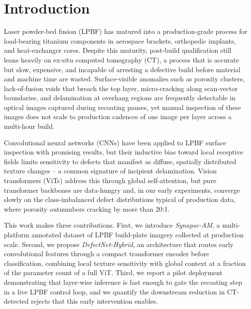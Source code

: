 \section{Introduction}
Laser powder-bed fusion (LPBF) has matured into a production-grade process for load-bearing titanium components in aerospace brackets, orthopedic implants, and heat-exchanger cores. Despite this maturity, post-build qualification still leans heavily on ex-situ computed tomography (CT), a process that is accurate but slow, expensive, and incapable of arresting a defective build before material and machine time are wasted. Surface-visible anomalies such as porosity clusters, lack-of-fusion voids that breach the top layer, micro-cracking along scan-vector boundaries, and delamination at overhang regions are frequently detectable in optical images captured during recoating pauses, yet manual inspection of these images does not scale to production cadences of one image per layer across a multi-hour build.

Convolutional neural networks (CNNs) have been applied to LPBF surface inspection with promising results, but their inductive bias toward local receptive fields limits sensitivity to defects that manifest as diffuse, spatially distributed texture changes -- a common signature of incipient delamination. Vision transformers (ViTs) address this through global self-attention, but pure transformer backbones are data-hungry and, in our early experiments, converge slowly on the class-imbalanced defect distributions typical of production data, where porosity outnumbers cracking by more than 20:1.

This work makes three contributions. First, we introduce \textit{Synapse-AM}, a multi-platform annotated dataset of LPBF build-plate imagery collected at production scale. Second, we propose \textit{DefectNet-Hybrid}, an architecture that routes early convolutional features through a compact transformer encoder before classification, combining local texture sensitivity with global context at a fraction of the parameter count of a full ViT. Third, we report a pilot deployment demonstrating that layer-wise inference is fast enough to gate the recoating step in a live LPBF control loop, and we quantify the downstream reduction in CT-detected rejects that this early intervention enables.

